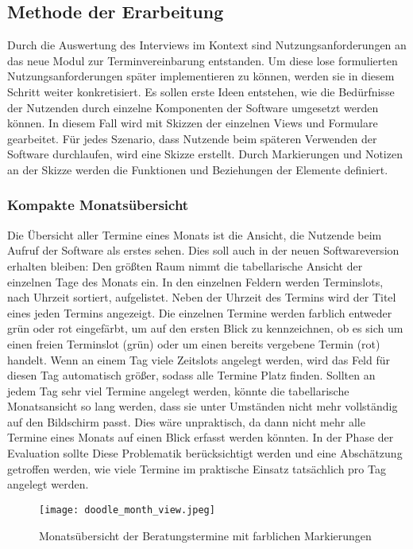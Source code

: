 \subsection*{Methode der Erarbeitung}
Durch die Auswertung des Interviews im Kontext sind Nutzungsanforderungen an
das neue Modul zur Terminvereinbarung entstanden. Um diese lose formulierten
Nutzungsanforderungen später implementieren zu können, werden sie in diesem
Schritt weiter konkretisiert. Es sollen erste Ideen entstehen, wie die
Bedürfnisse der Nutzenden durch einzelne Komponenten der Software umgesetzt
werden können. In diesem Fall wird mit Skizzen der einzelnen \glspl{View} und
Formulare gearbeitet. Für jedes Szenario, dass Nutzende beim späteren Verwenden
der Software durchlaufen, wird eine Skizze erstellt. Durch Markierungen und
Notizen an der Skizze werden die Funktionen und Beziehungen der Elemente
definiert.

\subsubsection{Kompakte Monatsübersicht}

Die Übersicht aller Termine eines Monats ist die Ansicht, die Nutzende beim
Aufruf der Software als erstes sehen. Dies soll auch in der neuen
Softwareversion erhalten bleiben: Den größten Raum nimmt die tabellarische
Ansicht der einzelnen Tage des Monats ein. In den einzelnen Feldern werden
Terminslots, nach Uhrzeit sortiert, aufgelistet. Neben der Uhrzeit des Termins
wird der Titel eines jeden Termins angezeigt. Die einzelnen Termine werden
farblich entweder grün oder rot eingefärbt, um auf den ersten Blick zu
kennzeichnen, ob es sich um einen freien Terminslot (grün) oder um einen
bereits vergebene Termin (rot) handelt. Wenn an einem Tag viele Zeitslots
angelegt werden, wird das Feld für diesen Tag automatisch größer, sodass alle
Termine Platz finden. Sollten an jedem Tag sehr viel Termine angelegt werden,
könnte die tabellarische Monatsansicht so lang werden, dass sie unter Umständen
nicht mehr vollständig auf den Bildschirm passt. Dies wäre unpraktisch, da dann
nicht mehr alle Termine eines Monats auf einen Blick erfasst werden könnten. In
der Phase der Evaluation sollte Diese Problematik berücksichtigt werden und
eine Abschätzung getroffen werden, wie viele Termine im praktische Einsatz
tatsächlich pro Tag angelegt werden.

\begin{figure}[H]
    \caption{Monatsübersicht der Beratungstermine mit farblichen Markierungen}
    \centering
    \texttt{[image: doodle\_month\_view.jpeg]}
\end{figure}

